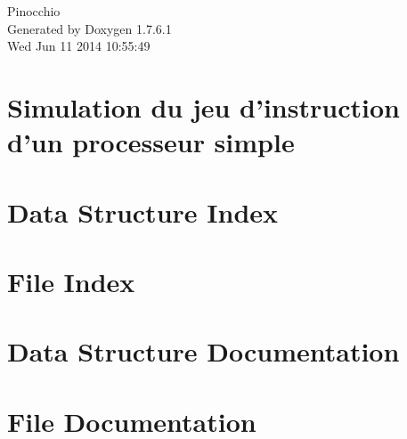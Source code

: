 \documentclass[a4paper]{book}
\begin{document}
\hypersetup{pageanchor=false,citecolor=blue}
\begin{titlepage}
\vspace*{7cm}
\begin{center}
{\Large \-Pinocchio }\\
\vspace*{1cm}
{\large \-Generated by Doxygen 1.7.6.1}\\
\vspace*{0.5cm}
{\small Wed Jun 11 2014 10:55:49}\\
\end{center}
\end{titlepage}
\clearemptydoublepage
{}
\tableofcontents
\clearemptydoublepage
{}
\hypersetup{pageanchor=true,citecolor=blue}
\chapter{\-Simulation du jeu d'instruction d'un processeur simple}
\label{index}\hypertarget{index}{}
\chapter{\-Data \-Structure \-Index}

\chapter{\-File \-Index}

\chapter{\-Data \-Structure \-Documentation}


\chapter{\-File \-Documentation}
















\printindex
\end{document}
